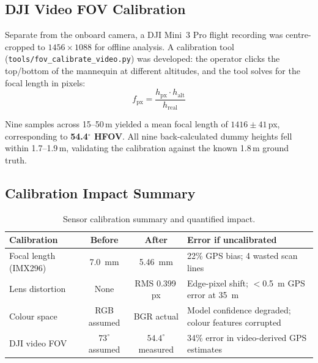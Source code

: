 \documentclass[10pt,a4paper]{article}
\begin{document}
\subsection{DJI Video FOV Calibration}

Separate from the onboard camera, a DJI Mini~3 Pro flight recording was centre-cropped to $1456 \times 1088$ for offline analysis. A calibration tool (\texttt{tools/fov\_calibrate\_video.py}) was developed: the operator clicks the top/bottom of the mannequin at different altitudes, and the tool solves for the focal length in pixels:
\begin{equation}
    f_{\mathrm{px}} = \frac{h_{\mathrm{px}} \cdot h_{\mathrm{alt}}}{h_{\mathrm{real}}}
\end{equation}

Nine samples across 15--50\,m yielded a mean focal length of $1416 \pm 41$\,px, corresponding to \textbf{54.4$^{\circ}$ HFOV}. All nine back-calculated dummy heights fell within 1.7--1.9\,m, validating the calibration against the known 1.8\,m ground truth.

\subsection{Calibration Impact Summary}

\begin{table}[ht]
  \centering
  \caption{Sensor calibration summary and quantified impact.}\label{tab:calibration-summary}
  \renewcommand{\arraystretch}{1.25}
  \begin{tabular}{@{}p{2.8cm}ccp{4.5cm}@{}}
    \toprule
    \textbf{Calibration} & \textbf{Before} & \textbf{After} & \textbf{Error if uncalibrated} \\
    \midrule
    Focal length (IMX296) & \SI{7.0}{\milli\metre} & \SI{5.46}{\milli\metre} & 22\% GPS bias; 4 wasted scan lines \\
    Lens distortion & None & RMS 0.399\,px & Edge-pixel shift; $<$\SI{0.5}{\metre} GPS error at \SI{35}{\metre} \\
    Colour space & RGB assumed & BGR actual & Model confidence degraded; colour features corrupted \\
    DJI video FOV & $73^{\circ}$ assumed & $54.4^{\circ}$ measured & 34\% error in video-derived GPS estimates \\
    \bottomrule
  \end{tabular}
\end{table}


\end{document}

